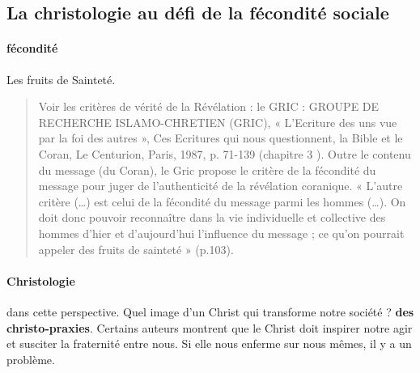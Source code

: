 \subsection{La christologie au défi de la fécondité sociale} 


\paragraph{fécondité} Les fruits de Sainteté. 
\begin{quote}
    Voir les critères de vérité de la Révélation : le GRIC : GROUPE DE RECHERCHE
ISLAMO-CHRETIEN (GRIC), « L’Ecriture des uns vue par la foi des autres », Ces Ecritures
qui nous questionnent, la Bible et le Coran, Le Centurion, Paris, 1987, p. 71-139 (chapitre 3 ).
Outre le contenu du message (du Coran), le Gric propose le critère de la fécondité du message
pour juger de l’authenticité de la révélation coranique. « L’autre critère (…) est celui de la
fécondité du message parmi les hommes (…). On doit donc pouvoir reconnaître dans la vie
individuelle et collective des hommes d’hier et d’aujourd’hui l’influence du message ; ce
qu’on pourrait appeler des fruits de sainteté » (p.103).
\end{quote}

\paragraph{Christologie} dans cette perspective. Quel image d'un Christ qui transforme notre société ? \textbf{des christo-praxies}. Certains auteurs montrent que le Christ doit inspirer notre agir et susciter la fraternité entre nous. Si elle nous enferme sur nous mêmes, il y a un problème.

 










 


